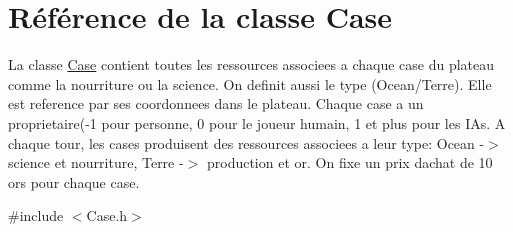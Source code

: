 \hypertarget{classCase}{}\section{Référence de la classe Case}
\label{classCase}


La classe \hyperlink{classCase}{Case} contient toutes les ressources associees a chaque case du plateau comme la nourriture ou la science. On definit aussi le type (Ocean/\+Terre). Elle est reference par ses coordonnees dans le plateau. Chaque case a un proprietaire(-\/1 pour personne, 0 pour le joueur humain, 1 et plus pour les I\+As. A chaque tour, les cases produisent des ressources associees a leur type\+: Ocean -\/$>$ science et nourriture, Terre -\/$>$ production et or. On fixe un prix d\textquotesingle{}achat de 10 ors pour chaque case.  




{\ttfamily \#include $<$Case.\+h$>$}

